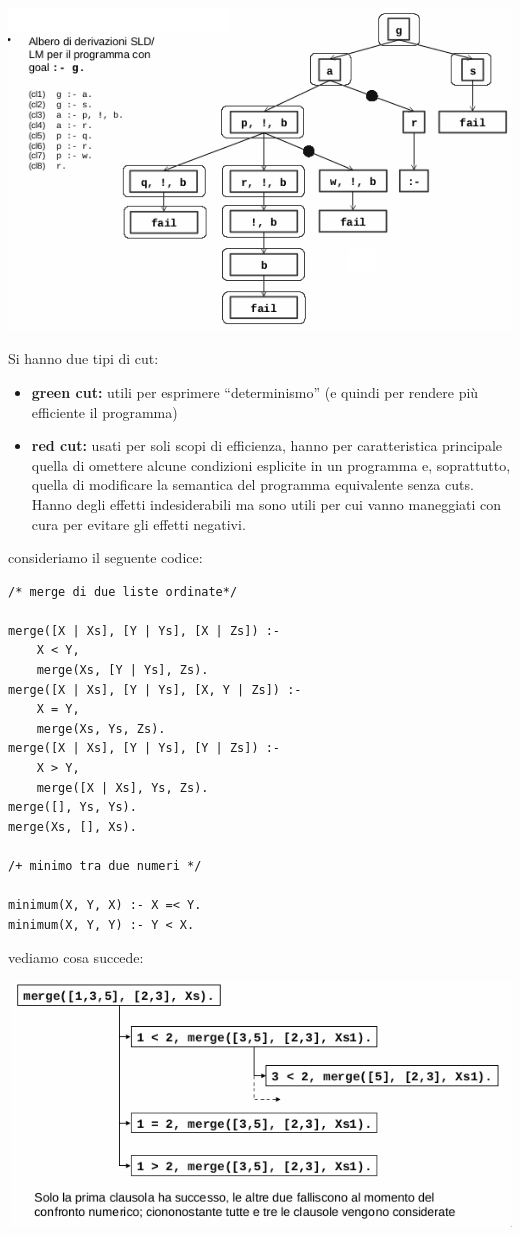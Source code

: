 \documentclass[a4paper]{report}
\begin{document}
\begin{center}
	\includegraphics[scale=0.8]{img/cut.png}
\end{center}
Si hanno due tipi di cut:
\begin{itemize}
\item \textbf{green cut: } utili per esprimere “determinismo” (e quindi per rendere più efficiente il programma)
\item \textbf{red cut: } usati per soli scopi di efficienza, hanno per caratteristica principale quella di omettere
  alcune condizioni esplicite in un programma e, soprattutto, quella di modificare la semantica del programma equivalente senza cuts.
  Hanno degli effetti indesiderabili ma sono utili per cui vanno maneggiati con cura per evitare gli effetti negativi.
\end{itemize}
consideriamo il seguente codice:
\begin{verbatim}
/* merge di due liste ordinate*/

merge([X | Xs], [Y | Ys], [X | Zs]) :-
	X < Y,
	merge(Xs, [Y | Ys], Zs).
merge([X | Xs], [Y | Ys], [X, Y | Zs]) :-
	X = Y,
	merge(Xs, Ys, Zs).
merge([X | Xs], [Y | Ys], [Y | Zs]) :-
	X > Y,
	merge([X | Xs], Ys, Zs).
merge([], Ys, Ys).
merge(Xs, [], Xs).

/+ minimo tra due numeri */

minimum(X, Y, X) :- X =< Y.
minimum(X, Y, Y) :- Y < X.
\end{verbatim}
vediamo cosa succede:
\begin{center}
\includegraphics[scale=0.8]{img/cut2.png}
\end{center}
\end{document}
